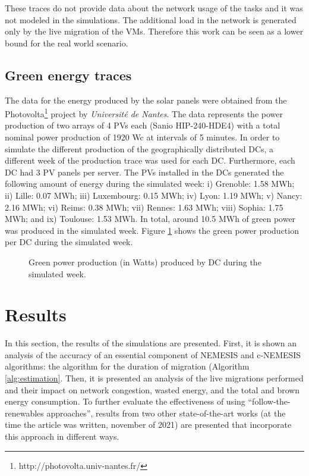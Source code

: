 These traces do not provide data about the network usage of the tasks and it was not modeled in the simulations. The additional load in the network is generated
only by the live migration of the VMs. Therefore this work can be seen as a lower bound for the real world scenario. 

\subsection{Green energy traces}

The data for the energy produced by the solar panels were obtained from the Photovolta\footnote{http://photovolta.univ-nantes.fr/} project by \textit{Université de Nantes}. The data represents the power production of two arrays of 4 PVs each (Sanio HIP-240-HDE4) with a total nominal power production of 1920 Wc at intervals of 5 minutes. In order to simulate the different production of the geographically distributed DCs,  a different week of the production trace was used for each DC. Furthermore, each DC had 3 PV panels per server. The PVs installed in the DCs generated the following amount of energy during the simulated week: i) Grenoble: 1.58 MWh; ii) Lille: 0.07 MWh; iii) Luxembourg: 0.15 MWh; iv) Lyon: 1.19 MWh; v) Nancy: 2.16 MWh; vi) Reims: 0.38 MWh; vii) Rennes: 1.63 MWh; viii) Sophia: 1.75 MWh; and ix) Toulouse: 1.53 MWh. In total, around 10.5 MWh of green power was produced in the simulated week. Figure \ref{fig:green_power} shows the green power production per DC during the simulated week.

 \begin{figure}[!htbp]
  \centering
   {}
  \caption{Green power production (in Watts) produced by DC during the
  simulated week.}
  \label{fig:green_power}
\end{figure}



\section{Results}

\label{sec:results_smargreens}

In this section,  the results of the simulations are presented. First, it is shown an analysis of the accuracy of an essential component of NEMESIS and c-NEMESIS algorithms: the algorithm for the duration of migration (Algorithm \ref{alg:estimation}. Then,  it is presented an analysis of the live migrations performed and their impact on network congestion, wasted energy, and the total and brown energy consumption. To further evaluate the effectiveness of using ``follow-the-renewables approaches'', results from two other state-of-the-art works (at the time the article was written, november of 2021) are presented that incorporate this approach in different ways.


